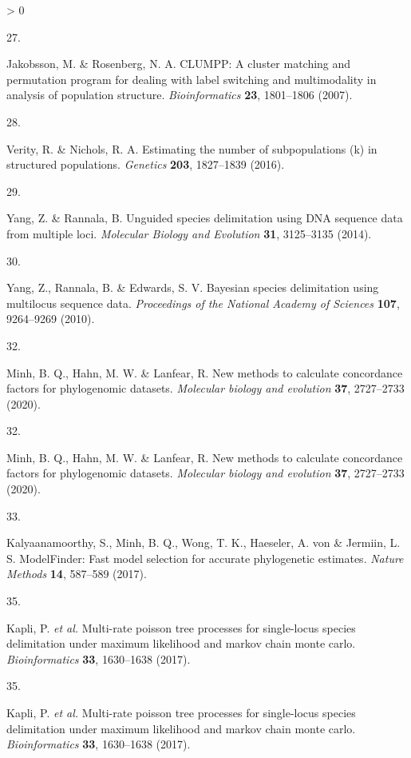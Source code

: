 \documentclass[
  11pt,
]{article}
\newlength{\cslhangindent}
\newlength{\csllabelwidth}
\newenvironment{CSLReferences}[2] %
 {%
  \setlength{\parindent}{0pt}
  \ifodd #1 \everypar{\setlength{\hangindent}{\cslhangindent}}\ignorespaces\fi
  \ifnum #2 > 0
  \setlength{\parskip}{#2\baselineskip}
  \fi
 }%
 {}
\newcommand{\CSLLeftMargin}[1]{\parbox[t]{\csllabelwidth}{#1}}
\newcommand{\CSLRightInline}[1]{\parbox[t]{\linewidth - \csllabelwidth}{#1}\break}
\begin{document}
\begin{CSLReferences}{0}{0}
\leavevmode\hypertarget{ref-jakobsson2007clumpp}{}%
\CSLLeftMargin{27. }
\CSLRightInline{Jakobsson, M. \& Rosenberg, N. A. CLUMPP: A cluster matching and permutation program for dealing with label switching and multimodality in analysis of population structure. \emph{Bioinformatics} \textbf{23}, 1801--1806 (2007).}

\leavevmode\hypertarget{ref-verity2016estimating}{}%
\CSLLeftMargin{28. }
\CSLRightInline{Verity, R. \& Nichols, R. A. Estimating the number of subpopulations (k) in structured populations. \emph{Genetics} \textbf{203}, 1827--1839 (2016).}

\leavevmode\hypertarget{ref-yang2014unguided}{}%
\CSLLeftMargin{29. }
\CSLRightInline{Yang, Z. \& Rannala, B. Unguided species delimitation using DNA sequence data from multiple loci. \emph{Molecular Biology and Evolution} \textbf{31}, 3125--3135 (2014).}

\leavevmode\hypertarget{ref-Yang:2010jz}{}%
\CSLLeftMargin{30. }
\CSLRightInline{Yang, Z., Rannala, B. \& Edwards, S. V. {Bayesian species delimitation using multilocus sequence data}. \emph{Proceedings of the National Academy of Sciences} \textbf{107}, 9264--9269 (2010).}

\leavevmode\hypertarget{ref-minh2020new}{}%
\CSLLeftMargin{32. }
\CSLRightInline{Minh, B. Q., Hahn, M. W. \& Lanfear, R. New methods to calculate concordance factors for phylogenomic datasets. \emph{Molecular biology and evolution} \textbf{37}, 2727--2733 (2020).}

\leavevmode\hypertarget{ref-minh2020new}{}%
\CSLLeftMargin{32. }
\CSLRightInline{Minh, B. Q., Hahn, M. W. \& Lanfear, R. New methods to calculate concordance factors for phylogenomic datasets. \emph{Molecular biology and evolution} \textbf{37}, 2727--2733 (2020).}

\leavevmode\hypertarget{ref-kalyaanamoorthy2017modelfinder}{}%
\CSLLeftMargin{33. }
\CSLRightInline{Kalyaanamoorthy, S., Minh, B. Q., Wong, T. K., Haeseler, A. von \& Jermiin, L. S. ModelFinder: Fast model selection for accurate phylogenetic estimates. \emph{Nature Methods} \textbf{14}, 587--589 (2017).}

\leavevmode\hypertarget{ref-kapli2017multi}{}%
\CSLLeftMargin{35. }
\CSLRightInline{Kapli, P. \emph{et al.} Multi-rate poisson tree processes for single-locus species delimitation under maximum likelihood and markov chain monte carlo. \emph{Bioinformatics} \textbf{33}, 1630--1638 (2017).}

\leavevmode\hypertarget{ref-kapli2017multi}{}%
\CSLLeftMargin{35. }
\CSLRightInline{Kapli, P. \emph{et al.} Multi-rate poisson tree processes for single-locus species delimitation under maximum likelihood and markov chain monte carlo. \emph{Bioinformatics} \textbf{33}, 1630--1638 (2017).}


\end{CSLReferences}
\end{document}
